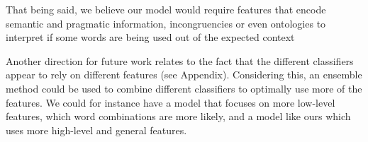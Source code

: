 That being said, we believe our model would require features that encode semantic and pragmatic information, incongruencies or even ontologies to interpret if some words are being used out of the expected context

Another direction for future work relates to the fact that the different classifiers appear to rely on different features (see Appendix). Considering this, an ensemble method could be used to combine different classifiers to optimally use more of the features. We could for instance have a model that focuses on more low-level features, which word combinations are more likely, and a model like ours which uses more high-level and general features. 



